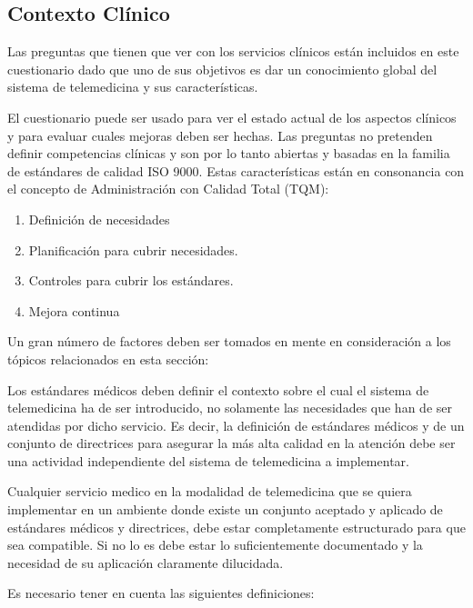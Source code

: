 \subsection{Contexto Clínico}

Las preguntas que tienen que ver con los servicios clínicos están incluidos en este cuestionario dado que uno de sus objetivos es dar un conocimiento global del sistema de telemedicina y sus características. 

El cuestionario puede ser usado para ver el estado actual de los aspectos clínicos y para evaluar cuales mejoras deben ser hechas. Las preguntas no pretenden definir competencias clínicas y son por lo tanto abiertas y basadas en la familia de estándares de calidad ISO 9000. Estas características están en consonancia con el concepto de Administración con Calidad Total  (TQM):

\begin{enumerate}
\item Definición de necesidades
\item Planificación para cubrir necesidades.
\item Controles para cubrir los estándares.
\item Mejora continua
\end{enumerate}

Un gran número de factores deben ser tomados en mente en consideración a los tópicos relacionados en esta sección:

Los estándares médicos deben definir el contexto sobre el cual el sistema de telemedicina ha de ser introducido, no solamente las necesidades que han de ser atendidas por dicho servicio. Es decir, la definición de estándares médicos y de un conjunto de directrices para asegurar la más alta calidad en la atención debe ser una actividad independiente del sistema de telemedicina a implementar.

Cualquier servicio medico en la modalidad de telemedicina que se quiera implementar en un ambiente donde existe un conjunto aceptado y aplicado de estándares médicos y directrices, debe estar completamente estructurado para que sea compatible. Si no lo es debe estar lo suficientemente documentado y la necesidad de su aplicación claramente dilucidada.

Es necesario tener en cuenta las siguientes definiciones:

